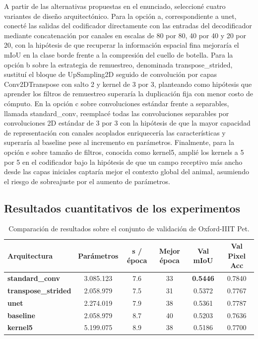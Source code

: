 \documentclass[10pt,letterpaper]{article}
\newcommand{\sangria}{\hspace*{1.5em}}
\begin{document}
\sangria A partir de las alternativas propuestas en el enunciado, seleccioné cuatro variantes de diseño arquitectónico. Para la opción a, correspondiente a unet, conecté las salidas del codificador directamente con las entradas del decodificador mediante concatenación por canales en escalas de 80 por 80, 40 por 40 y 20 por 20, con la hipótesis de que recuperar la información espacial fina mejoraría el mIoU en la clase borde frente a la compresión del cuello de botella. Para la opción b sobre la estrategia de remuestreo, denominada transpose\_strided, sustituí el bloque de UpSampling2D seguido de convolución por capas Conv2DTranspose con salto 2 y kernel de 3 por 3, planteando como hipótesis que aprender los filtros de remuestreo superaría la duplicación fija con menor costo de cómputo. En la opción c sobre convoluciones estándar frente a separables, llamada standard\_conv, reemplacé todas las convoluciones separables por convoluciones 2D estándar de 3 por 3 con la hipótesis de que la mayor capacidad de representación con canales acoplados enriquecería las características y superaría al baseline pese al incremento en parámetros. Finalmente, para la opción e sobre tamaño de filtros, conocida como kernel5, amplié los kernels a 5 por 5 en el codificador bajo la hipótesis de que un campo receptivo más ancho desde las capas iniciales captaría mejor el contexto global del animal, asumiendo el riesgo de sobreajuste por el aumento de parámetros.

\subsection{Resultados cuantitativos de los experimentos}

\begin{table}[h]
    \centering
    \small
    \caption{Comparación de resultados sobre el conjunto de validación de Oxford-IIIT Pet.}
    \label{tab_resultados}
    \begin{tabular}{lccccc}
        \toprule
        \textbf{Arquitectura}       & \textbf{Parámetros} & \textbf{s / época} & \textbf{Mejor época} & \textbf{Val mIoU} & \textbf{Val Pixel Acc} \\
        \midrule
        \textbf{standard\_conv}     & 3.085.123           & 7.6                & 33                   & \textbf{0.5446}   & 0.7840                 \\
        \textbf{transpose\_strided} & 2.058.979           & 7.5                & 31                   & 0.5372            & 0.7767                 \\
        \textbf{unet}               & 2.274.019           & 7.9                & 38                   & 0.5361            & 0.7787                 \\
        \textbf{baseline}           & 2.058.979           & 8.7                & 40                   & 0.5203            & 0.7636                 \\
        \textbf{kernel5}            & 5.199.075           & 8.9                & 38                   & 0.5186            & 0.7700                 \\
        \bottomrule
    \end{tabular}
\end{table}
\end{document}

